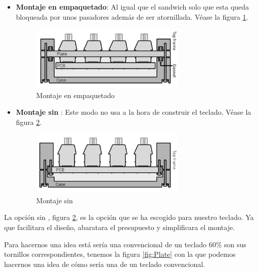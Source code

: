 \begin{itemize}
    \item \textbf{Montaje en empaquetado}: Al igual que el sandwich solo que esta queda bloqueada por unos pasadores además de ser atornillada. Véase  la figura \ref{fig:Montaje6}.
    \begin{figure}[H]
        \centering
        \includegraphics[width=0.7\textwidth]{imagenes/Capitulos/Cap03/Montajes/Montaje6.png}
        \caption{Montaje en empaquetado \cite{Keyboards-Mounting-Styles}}
        \label{fig:Montaje6}
    \end{figure}
    
    \item \textbf{Montaje sin }: Este modo no usa  a la hora de construir el teclado. Véase  la figura \ref{fig:Montaje7}.
    \begin{figure}[H]
        \centering
        \includegraphics[width=0.7\textwidth]{imagenes/Capitulos/Cap03/Montajes/Montaje7.png}
        \caption{Montaje sin  \cite{Keyboards-Mounting-Styles}}
        \label{fig:Montaje7}
    \end{figure}
    
\end{itemize}
\newpage
La opción sin , figura \ref{fig:Montaje7}, es la opción que se ha escogido para nuestro teclado. Ya que facilitara el diseño, abaratara el presupuesto y simplificara el montaje.

Para hacernos una idea está sería una  convencional de un teclado 60\% son sus tornillos correspondientes, tenemos la figura \ref{fig:Plate} con la que podemos hacernos una idea de cómo sería una  de un teclado convencional.

